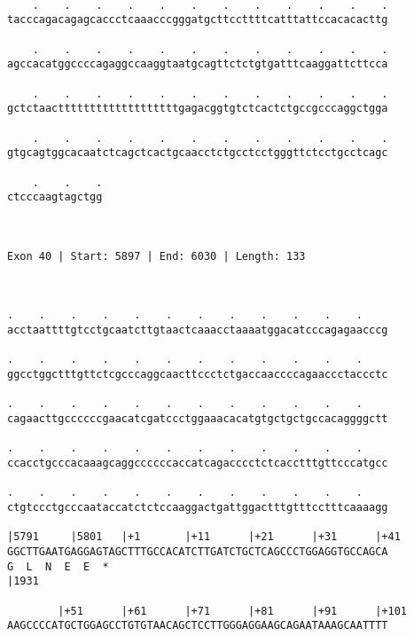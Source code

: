 \documentclass{article}
\begin{document}
\begin{Verbatim}
  
    .    .    .    .    .    .    .    .    .    .    .    .
tacccagacagagcaccctcaaacccgggatgcttccttttcatttattccacacacttg
                                                            
    .    .    .    .    .    .    .    .    .    .    .    .
agccacatggccccagaggccaaggtaatgcagttctctgtgatttcaaggattcttcca
                                                            
    .    .    .    .    .    .    .    .    .    .    .    .
gctctaactttttttttttttttttttgagacggtgtctcactctgccgcccaggctgga
                                                            
    .    .    .    .    .    .    .    .    .    .    .    .
gtgcagtggcacaatctcagctcactgcaacctctgcctcctgggttctcctgcctcagc
                                                            
    .    .    .
ctcccaagtagctgg
               
               
 
Exon 40 | Start: 5897 | End: 6030 | Length: 133



.    .    .    .    .    .    .    .    .    .    .    .    
acctaattttgtcctgcaatcttgtaactcaaacctaaaatggacatcccagagaacccg
                                                            
.    .    .    .    .    .    .    .    .    .    .    .    
ggcctggctttgttctcgcccaggcaacttccctctgaccaaccccagaaccctaccctc
                                                            
.    .    .    .    .    .    .    .    .    .    .    .    
cagaacttgccccccgaacatcgatccctggaaacacatgtgctgctgccacaggggctt
                                                            
.    .    .    .    .    .    .    .    .    .    .    .    
ccacctgcccacaaagcaggccccccaccatcagacccctctcacctttgttcccatgcc
                                                            
.    .    .    .    .    .    .    .    .    .    .    .    
ctgtccctgcccaataccatctctccaaggactgattggactttgtttcctttcaaaagg
                                                            
|5791     |5801   |+1       |+11      |+21      |+31      |+41
GGCTTGAATGAGGAGTAGCTTTGCCACATCTTGATCTGCTCAGCCCTGGAGGTGCCAGCA
G  L  N  E  E  *   
|1931                                                       
  
        |+51      |+61      |+71      |+81      |+91      |+101
AAGCCCCATGCTGGAGCCTGTGTAACAGCTCCTTGGGAGGAAGCAGAATAAAGCAATTTT
                                                            

\end{Verbatim}
\end{document}
